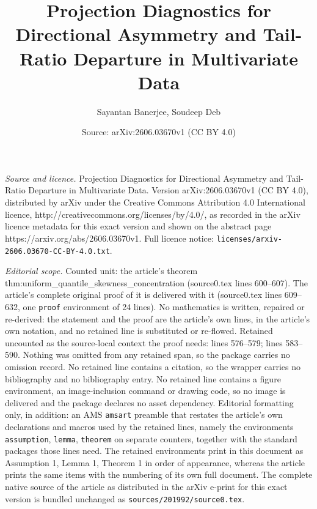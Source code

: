 \documentclass[10pt,a4paper]{amsart}
\title{Projection Diagnostics for Directional Asymmetry and Tail-Ratio Departure in Multivariate Data}
\author{Sayantan Banerjee, Soudeep Deb}
\date{Source: arXiv:2606.03670v1 (CC BY 4.0)}
\begin{document}
\maketitle

\noindent\emph{Source and licence.} Projection Diagnostics for Directional Asymmetry and Tail-Ratio Departure in Multivariate Data. Version arXiv:2606.03670v1 (CC BY 4.0), distributed by arXiv under the Creative Commons Attribution 4.0 International licence, http://creativecommons.org/licenses/by/4.0/, as recorded in the arXiv licence metadata for this exact version and shown on the abstract page https://arxiv.org/abs/2606.03670v1. Full licence notice: \texttt{licenses/arxiv-2606.03670-CC-BY-4.0.txt}.\par\smallskip

\noindent\textit{Editorial scope.} Counted unit: the article's theorem thm:uniform\_quantile\_skewness\_concentration (source0.tex lines 600--607). The article's complete original proof of it is delivered with it (source0.tex lines 609--632, one \texttt{proof} environment of 24 lines). No mathematics is written, repaired or re-derived: the statement and the proof are the article's own lines, in the article's own notation, and no retained line is substituted or re-flowed.  Retained uncounted as the source-local context the proof needs: lines 576--579; lines 583--590.  Nothing was omitted from any retained span, so the package carries no omission record.  No retained line contains a citation, so the wrapper carries no bibliography and no bibliography entry.  No retained line contains a figure environment, an image-inclusion command or drawing code, so no image is delivered and the package declares no asset dependency.  Editorial formatting only, in addition: an AMS \texttt{amsart} preamble that restates the article's own declarations and macros used by the retained lines, namely the environments \texttt{assumption}, \texttt{lemma}, \texttt{theorem} on separate counters, together with the standard packages those lines need.  The retained environments print in this document as Assumption 1, Lemma 1, Theorem 1 in order of appearance, whereas the article prints the same items with the numbering of its own full document.  The complete native source of the article as distributed in the arXiv e-print for this exact version is bundled unchanged as \texttt{sources/201992/source0.tex}.
\end{document}
